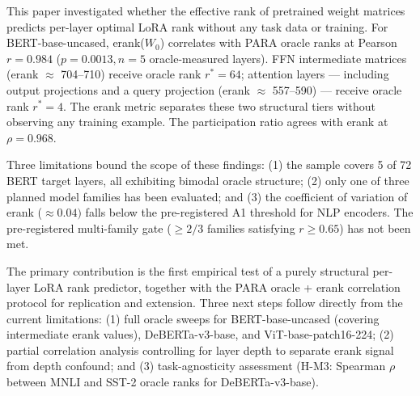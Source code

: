 
This paper investigated whether the effective rank of pretrained weight matrices predicts per-layer optimal LoRA rank without any task data or training. For BERT-base-uncased, erank($W_0$) correlates with PARA oracle ranks at Pearson $r = 0.984$ ($p = 0.0013, n = 5$ oracle-measured layers). FFN intermediate matrices (erank $\approx$ 704--710) receive oracle rank $r^* = 64$; attention layers --- including output projections and a query projection (erank $\approx$ 557--590) --- receive oracle rank $r^* = 4$. The erank metric separates these two structural tiers without observing any training example. The participation ratio agrees with erank at $\rho = 0.968$.

Three limitations bound the scope of these findings: (1) the sample covers 5 of 72 BERT target layers, all exhibiting bimodal oracle structure; (2) only one of three planned model families has been evaluated; and (3) the coefficient of variation of erank ($\approx 0.04)$ falls below the pre-registered A1 threshold for NLP encoders. The pre-registered multi-family gate ($\geq 2/3$ families satisfying $r \geq 0.65$) has not been met.

The primary contribution is the first empirical test of a purely structural per-layer LoRA rank predictor, together with the PARA oracle + erank correlation protocol for replication and extension. Three next steps follow directly from the current limitations: (1) full oracle sweeps for BERT-base-uncased (covering intermediate erank values), DeBERTa-v3-base, and ViT-base-patch16-224; (2) partial correlation analysis controlling for layer depth to separate erank signal from depth confound; and (3) task-agnosticity assessment (H-M3: Spearman $\rho$ between MNLI and SST-2 oracle ranks for DeBERTa-v3-base).

